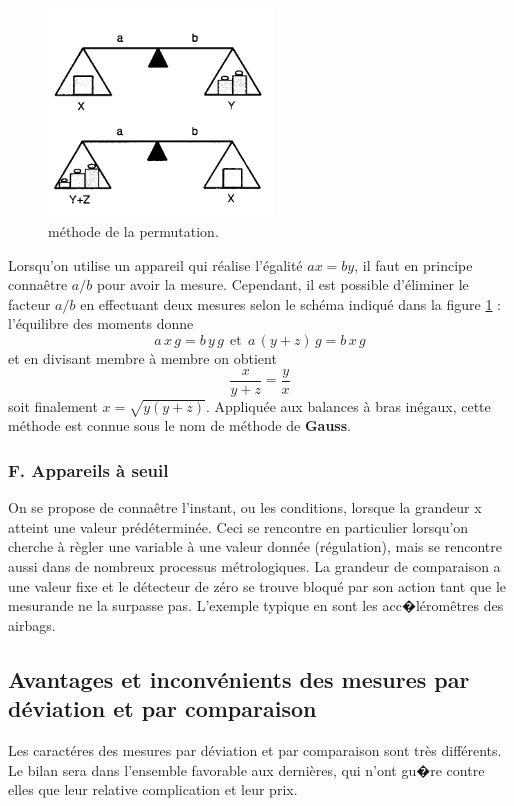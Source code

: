 \begin{figure}
   \vspace{-2cm}
   \centering
   \includegraphics[width=6cm]{assets/figures/perm.pdf}
   \caption{méthode de la permutation.}
   \label{fig:perm}
\end{figure}
Lorsqu'on utilise un appareil qui réalise l'égalité $ax=by$, il faut en principe connaêtre $a/b$ pour avoir la mesure. Cependant, il est possible d'éliminer le facteur $a/b$ en effectuant deux mesures selon le schéma indiqué dans la figure \ref{fig:perm} : l'équilibre des moments donne
$$
a\,x\,g=b\,y\,g\ \ \text{et}\ \ a\,(y+z)\,g=b\,x\,g
$$
et en divisant membre à membre on obtient
$$
\frac{x}{y+z}=\frac{y}{x}
$$
soit finalement $x=\sqrt{y(y+z)}$. Appliquée aux balances à bras inégaux, cette méthode est connue sous le nom de méthode de \textbf{Gauss}.

\subsubsection{F. Appareils à seuil}

On se propose de connaêtre l'instant, ou les conditions, lorsque la grandeur x atteint une valeur prédéterminée. Ceci se rencontre en particulier lorsqu'on cherche à règler une variable à une valeur donnée (régulation), mais se rencontre aussi dans de nombreux processus métrologiques. La grandeur de comparaison a une valeur fixe et le détecteur de zéro se trouve bloqué par son action tant que le mesurande ne la surpasse pas. L'exemple typique en sont les acc�léromêtres des airbags.

\subsection{Avantages et inconvénients des mesures par déviation et par comparaison}

Les caractéres des mesures par déviation et par comparaison sont très différents. Le bilan sera dans l'ensemble favorable aux dernières, qui n'ont gu�re contre elles que leur relative complication et leur prix.


